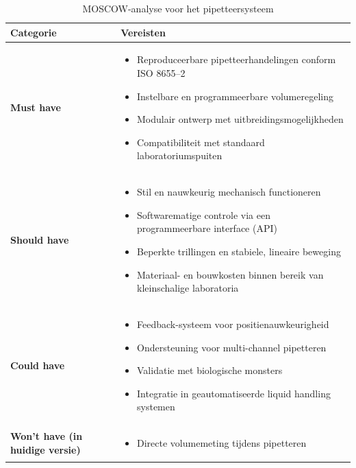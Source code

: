 \begin{table}[H]
    \centering
    \caption{MOSCOW-analyse voor het pipetteersysteem}\label{tab:moscow}
    \begin{tabularx}{\textwidth}{|l|X|}
        \hline
        \textbf{Categorie} & \textbf{Vereisten} \\
        \hline
        \textbf{Must have} & 
        \begin{itemize}
            \item Reproduceerbare pipetteerhandelingen conform ISO 8655--2
            \item Instelbare en programmeerbare volumeregeling
            \item Modulair ontwerp met uitbreidingsmogelijkheden
            \item Compatibiliteit met standaard laboratoriumspuiten
        \end{itemize} \\
        \hline
        \textbf{Should have} & 
        \begin{itemize}
            \item Stil en nauwkeurig mechanisch functioneren
            \item Softwarematige controle via een programmeerbare interface (API)
            \item Beperkte trillingen en stabiele, lineaire beweging
            \item Materiaal- en bouwkosten binnen bereik van kleinschalige laboratoria
        \end{itemize} \\
        \hline
        \textbf{Could have} & 
        \begin{itemize}
            \item Feedback-systeem voor positienauwkeurigheid
            \item Ondersteuning voor multi-channel pipetteren
            \item Validatie met biologische monsters
            \item Integratie in geautomatiseerde liquid handling systemen
        \end{itemize} \\
        \hline
        \textbf{Won’t have (in huidige versie)} & 
        \begin{itemize}
            \item Directe volumemeting tijdens pipetteren
        \end{itemize} \\
        \hline
    \end{tabularx}
\end{table}

